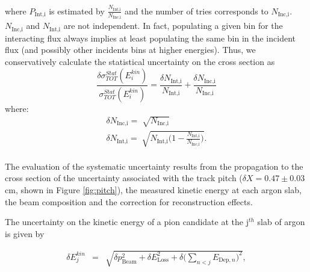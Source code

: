 \documentclass[aps,prl,twocolumn,showpacs,superscriptaddress,groupedaddress]{revtex4}  %
\begin{document}
where  $P_{\text{Int,i}}$ is estimated by $\frac{ N_{\text{Int,i}}}{N_{\text{Inc,i}}}$ and the number of tries corresponds to $N_{\text{Inc,i}}$. $N_{\text{Inc,i}}$ and $N_{\text{Int,i}}$ are not independent. In fact, populating a given bin for the interacting flux always implies at least populating the same bin in the incident flux  (and possibly other incidents bins at higher energies). Thus, we conservatively calculate the statistical uncertainty on the cross section as 
\begin{equation}
\frac{\delta\sigma^{Stat}_{TOT}(E^{kin}_i)}{\sigma^{Stat}_{TOT}(E^{kin}_i)} =  \frac{\delta N_{\text{Int,i}}}{N_{\text{Int,i}}}+\frac{\delta N_{\text{Inc,i}}}{N_{\text{Inc,i}}}
\end{equation}
where:
\begin{eqnarray}
\delta N_{\text{Inc,i}} = \sqrt[]{N_{\text{Inc,i}}} \\
\delta N_{\text{Int,i}} = \sqrt[]{N_{\text{Int,i}}\Big(1-\frac{ N_{\text{Int,i}}}{N_{\text{Inc,i}}}\Big)}.
\end{eqnarray} \\


The evaluation of the systematic uncertainty results from the propagation to the cross section of the uncertainty associated with  the track pitch  ($\delta X = 0.47 \pm 0.03 $ cm, shown in Figure \ref{fig:pitch}),  the measured kinetic energy at each argon slab,  the  beam composition and the correction for reconstruction effects. 

The uncertainty on the kinetic energy of a pion candidate at the j$^{th}$ slab of argon  is given by

\begin{eqnarray}
\delta E^{kin}_{j} &=& \sqrt{\delta p_{\text{Beam}}^2 + \delta E_{\text{Loss}}^2 +  \delta \Big(\sum_{n < j} E_{\text{Dep},n}\Big)^2}, 
\end{eqnarray}
\end{document}
